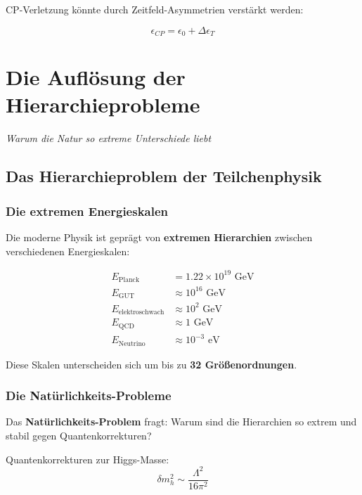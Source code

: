 \documentclass[12pt,a4paper]{report}
\begin{document}
CP-Verletzung könnte durch Zeitfeld-Asymmetrien verstärkt werden:

\begin{equation}
	\epsilon_{CP} = \epsilon_0 + \Delta\epsilon_T
\end{equation}

% 
	\chapter{Die Auflösung der Hierarchieprobleme}
	\textit{Warum die Natur so extreme Unterschiede liebt}
	
	\section{Das Hierarchieproblem der Teilchenphysik}
	
	\subsection{Die extremen Energieskalen}
	
	Die moderne Physik ist geprägt von \textbf{extremen Hierarchien} zwischen verschiedenen Energieskalen:
	
	\begin{align}
		E_{\text{Planck}} &= 1.22 \times 10^{19} \text{ GeV} \\
		E_{\text{GUT}} &\approx 10^{16} \text{ GeV} \\
		E_{\text{elektroschwach}} &\approx 10^2 \text{ GeV} \\
		E_{\text{QCD}} &\approx 1 \text{ GeV} \\
		E_{\text{Neutrino}} &\approx 10^{-3} \text{ eV}
	\end{align}
	
	Diese Skalen unterscheiden sich um bis zu \textbf{32 Größenordnungen}.
	
	\subsection{Die Natürlichkeits-Probleme}
	
	Das \textbf{Natürlichkeits-Problem} fragt: Warum sind die Hierarchien so extrem und stabil gegen Quantenkorrekturen?
	
	Quantenkorrekturen zur Higgs-Masse:
	\begin{equation}
		\delta m_h^2 \sim \frac{\Lambda^2}{16\pi^2}
	\end{equation}
	
\end{document}
